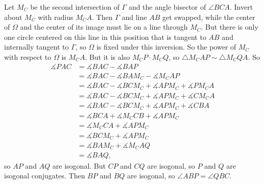 Let $M_C$ be the second intersection of $\Gamma$ and the angle bisector of $\angle{BCA}$. Invert about $M_C$ with radius $M_CA$. Then $\Gamma$ and line $AB$ get swapped, while the center of $\Omega$ and the center of its image must lie on a line through $M_C$. But there is only one circle centered on this line in this position that is tangent to $AB$ and internally tangent to $\Gamma$, so $\Omega$ is fixed under this inversion. So the power of $M_C$ with respect to $\Omega$ is $M_CA$. But it is also $M_CP\cdot M_CQ$, so $\triangle{M_CAP}\sim\triangle{M_CQA}$. So
\begin{align*}
	\measuredangle{PAC}&=\measuredangle{BAC}-\measuredangle{BAP}\\
	&=\measuredangle{BAC}-\measuredangle{BAM_C}-\measuredangle{M_CAP}\\
	&=\measuredangle{BAC}-\measuredangle{BCM_C}+\measuredangle{APM_C}+\measuredangle{PM_CA}\\
	&=\measuredangle{BAC}-\measuredangle{BCM_C}+\measuredangle{APM_C}+\measuredangle{CM_CA}\\
	&=\measuredangle{BAC}-\measuredangle{BCM_C}+\measuredangle{APM_C}+\measuredangle{CBA}\\
	&=\measuredangle{BCA}+\measuredangle{M_CCB}+\measuredangle{APM_C}\\
	&=\measuredangle{M_CCA}+\measuredangle{APM_C}\\
	&=\measuredangle{BCM_C}+\measuredangle{APM_C}\\
	&=\measuredangle{BAM_C}+\measuredangle{M_CAQ}\\
	&=\measuredangle{BAQ},
\end{align*}
so $AP$ and $AQ$ are isogonal. But $CP$ and $CQ$ are isogonal, so $P$ and $Q$ are isogonal conjugates. Then $BP$ and $BQ$ are isogonal, so $\angle{ABP}=\angle{QBC}$.